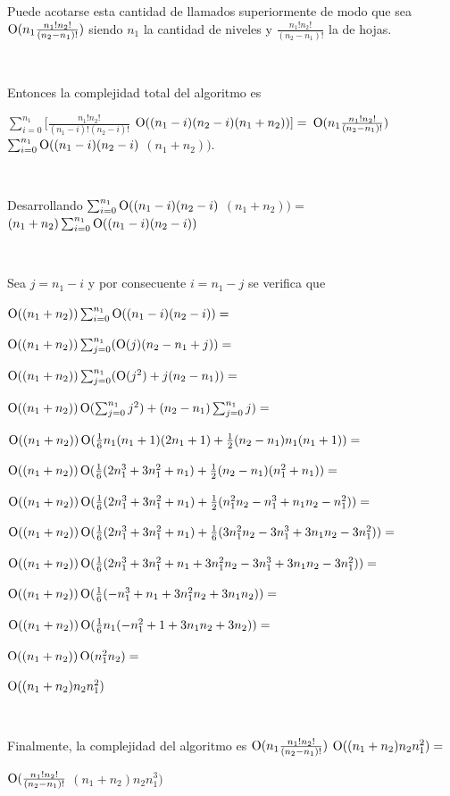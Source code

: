 Puede acotarse esta cantidad de llamados superiormente de modo que sea
$\operatorname{O}(n_1  \frac{n_1!  n_2!}{(n_2 - n_1)!})$ siendo $n_1$ la
cantidad de niveles y $\frac{n_1!  n_2!}{(n_2 - n_1)!}$ la de hojas.

~

Entonces la complejidad total del algoritmo es

$\sum_{i = 0}^{n_1}[\frac{n_1!  n_2!}{(n_1 - i)!  (n_2 - i)!}$
$ \operatorname{O}((n_1 - i)  (n_2 - i)  (n_1 + n_2))]=$
$\operatorname{O}(n_1  \frac{n_1!  n_2!}{(n_2 - n_1)!}) $
$\sum_{i = 0}^{n_1}\operatorname{O}((n_1 - i)  (n_2 - i)$
$ (n_1 + n_2))$.

~

Desarrollando
$\sum_{i = 0}^{n_1}\operatorname{O}((n_1 - i)  (n_2 - i)$
$ (n_1 + n_2))=$
$(n_1 + n_2)  \sum_{i = 0}^{n_1}\operatorname{O}((n_1 - i)  (n_2 - i))$

~

Sea $j = n_1 - i$ y por consecuente $i = n_1 - j$ se verifica que

$\operatorname{O}((n_1 + n_2))  \sum_{i = 0}^{n_1} \operatorname{O}((n_1 - i)  (n_2 - i))=$

$\operatorname{O}((n_1 + n_2))  \sum_{j = 0}^{n_1} (\operatorname{O}(j)  (n_2 - n_1 + j))=$

$\operatorname{O}((n_1 + n_2))  \sum_{j = 0}^{n_1} (\operatorname{O}(j^2) + j  (n_2 - n_1))=$

$\operatorname{O}((n_1 + n_2))  \operatorname{O}(\sum_{j = 0}^{n_1} j^2) + (n_2 - n_1)  \sum_{j = 0}^{n_1} j)=$

$\operatorname{O}((n_1 + n_2))  \operatorname{O}(\frac{1}{6}n_1(n_1 + 1)(2n_1 + 1) + \frac{1}{2}(n_2 - n_1)n_1(n_1 + 1))=$

$\operatorname{O}((n_1 + n_2))  \operatorname{O}(\frac{1}{6}(2n_1^3 + 3n_1^2 + n_1) + \frac{1}{2}(n_2 - n_1)(n_1^2 + n_1))=$

$\operatorname{O}((n_1 + n_2))  \operatorname{O}(\frac{1}{6}(2n_1^3 + 3n_1^2 + n_1) + \frac{1}{2}(n_1^2n_2 - n_1^3 + n_1n_2 - n_1^2))=$

$\operatorname{O}((n_1 + n_2))  \operatorname{O}(\frac{1}{6}(2n_1^3 + 3n_1^2 + n_1) + \frac{1}{6}(3n_1^2n_2 - 3n_1^3 + 3n_1n_2 - 3n_1^2))=$

$\operatorname{O}((n_1 + n_2))  \operatorname{O}(\frac{1}{6}(2n_1^3 + 3n_1^2 + n_1 + 3n_1^2n_2 - 3n_1^3 + 3n_1n_2 - 3n_1^2))=$

$\operatorname{O}((n_1 + n_2))  \operatorname{O}(\frac{1}{6}(-n_1^3 + n_1 + 3n_1^2n_2 + 3n_1n_2))=$

$\operatorname{O}((n_1 + n_2))  \operatorname{O}(\frac{1}{6}n_1(-n_1^2 + 1 + 3n_1n_2 + 3n_2))=$

$\operatorname{O}((n_1 + n_2))  \operatorname{O}(n_1^2n_2)=$

$\operatorname{O}((n_1 + n_2)  n_2  n_1^2)$

~

Finalmente, la complejidad del algoritmo es
$\operatorname{O}(n_1  \frac{n_1!  n_2!}{(n_2 - n_1)!}) $
$\operatorname{O}((n_1 + n_2)  n_2  n_1^2)=$

\begin{center}
$\operatorname{O}(\frac{n_1!  n_2!}{(n_2 - n_1)!} $
$(n_1 + n_2)  n_2  n_1^3)$
\end{center}

